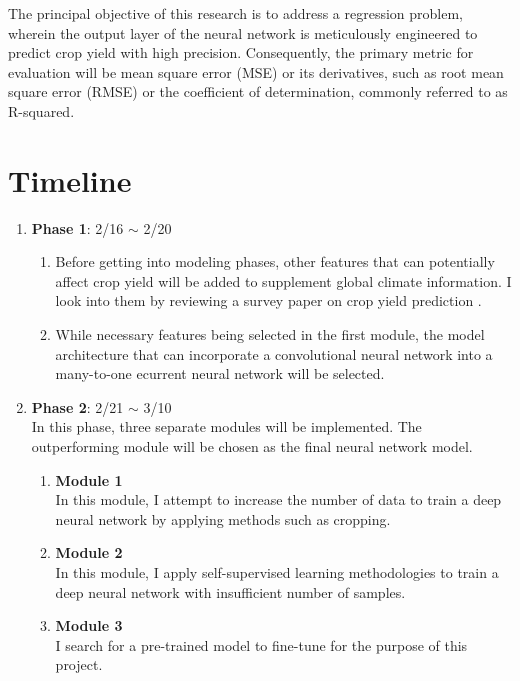 \documentclass[11pt, oneside]{article}   	%
\begin{document}
The principal objective of this research is to address a regression problem, wherein the output layer of the neural network is meticulously engineered to predict crop yield with high precision. Consequently, the primary metric for evaluation will be mean square error (MSE) or its derivatives, such as root mean square error (RMSE) or the coefficient of determination, commonly referred to as R-squared.

\section*{Timeline}

\begin{enumerate}
\item \textbf{Phase 1}: 2/16 $\sim$ 2/20
	\begin{enumerate}[label=(\alph*)]
	\item Before getting into modeling phases, other features that can potentially affect crop yield will be added to supplement global climate information. I look into them by reviewing a survey paper on crop yield prediction \cite{citation_key3}.
	\item While necessary features being selected in the first module, the model architecture that can incorporate a convolutional neural network into a many-to-one ecurrent neural network will be selected.
	\end{enumerate}

\item \textbf{Phase 2}: 2/21 $\sim$ 3/10 \\
In this phase, three separate modules will be implemented. The outperforming module will be chosen as the final neural network model.
	\begin{enumerate}[label=(\alph*)]
	\item \textbf{Module 1} \\
	In this module, I attempt to increase the number of data to train a deep neural network by applying methods such as cropping.
	\item \textbf{Module 2} \\
	In this module, I apply self-supervised learning methodologies to train a deep neural network with insufficient number of samples.
	\item \textbf{Module 3} \\
	I search for a pre-trained model to fine-tune for the purpose of this project.
	\end{enumerate}


\end{enumerate}
\end{document}
